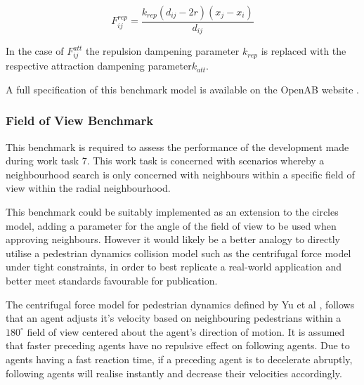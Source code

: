         \[F_{ij}^{rep} = \frac{k_{rep}(d_{ij} - 2r)(x_{j} - x_{i})} {d_{ij}}\]
        
        In the case of $F_{ij}^{att}$ the repulsion dampening parameter $k_{rep}$ is replaced with the respective attraction dampening parameter$k_{att}$.        
        
        A full specification of this benchmark model is available on the OpenAB website \cite{OPENAB-CIRCLES}.
        
      \subsubsection*{Field of View Benchmark}
        This benchmark is required to assess the performance of the development made during work task 7. This work task is concerned with scenarios whereby a neighbourhood search is only concerned with neighbours within a specific field of view within the radial neighbourhood.
        
        This benchmark could be suitably implemented as an extension to the circles model, adding a parameter for the angle of the field of view to be used when approving neighbours. However it would likely be a better analogy to directly utilise a pedestrian dynamics collision model such as the centrifugal force model under tight constraints, in order to best replicate a real-world application and better meet standards favourable for publication.
        
        The centrifugal force model for pedestrian dynamics defined by Yu et al \cite{YC*05}, follows that an agent adjusts it's velocity based on neighbouring pedestrians within a $180^{\circ}$ field of view centered about the agent's direction of motion. It is assumed that faster preceding agents have no repulsive effect on following agents. Due to agents having a fast reaction time, if a preceding agent is to decelerate abruptly, following agents will realise instantly and decrease their velocities accordingly.
        
